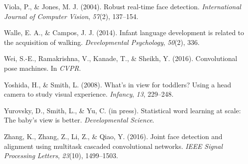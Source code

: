 \documentclass[10pt, letterpaper]{article}
\begin{document}
\hypertarget{ref-viola2004robust}{}
Viola, P., \& Jones, M. J. (2004). Robust real-time face detection.
\emph{International Journal of Computer Vision}, \emph{57}(2), 137--154.

\hypertarget{ref-walle2014}{}
Walle, E. A., \& Campos, J. J. (2014). Infant language development is
related to the acquisition of walking. \emph{Developmental Psychology},
\emph{50}(2), 336.

\hypertarget{ref-wei2016cpm}{}
Wei, S.-E., Ramakrishna, V., Kanade, T., \& Sheikh, Y. (2016).
Convolutional pose machines. In \emph{CVPR}.

\hypertarget{ref-yoshida2008}{}
Yoshida, H., \& Smith, L. (2008). What's in view for toddlers? Using a
head camera to study visual experience. \emph{Infancy}, \emph{13},
229--248.

\hypertarget{ref-yurovsky2012}{}
Yurovsky, D., Smith, L., \& Yu, C. (in press). Statistical word learning
at scale: The baby's view is better. \emph{Developmental Science}.

\hypertarget{ref-zhang2016}{}
Zhang, K., Zhang, Z., Li, Z., \& Qiao, Y. (2016). Joint face detection
and alignment using multitask cascaded convolutional networks.
\emph{IEEE Signal Processing Letters}, \emph{23}(10), 1499--1503.
\end{document}
